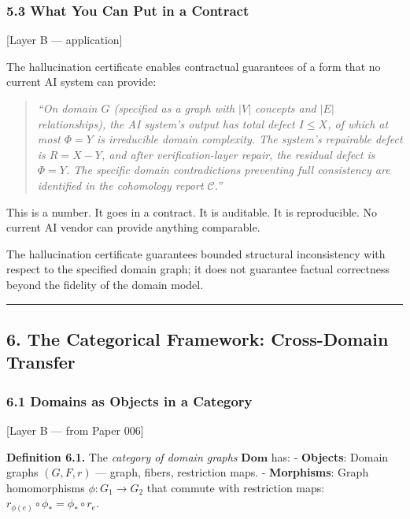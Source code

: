 \documentclass[
]{article}
\begin{document}
\subsubsection{5.3 What You Can Put in a
Contract}\label{what-you-can-put-in-a-contract}

{[}Layer B --- application{]}

The hallucination certificate enables contractual guarantees of a form
that no current AI system can provide:

\begin{quote}
\emph{``On domain \(G\) (specified as a graph with \(|V|\) concepts and
\(|E|\) relationships), the AI system's output has total defect
\(I \leq X\), of which at most \(\Phi = Y\) is irreducible domain
complexity. The system's repairable defect is \(R = X - Y\), and after
verification-layer repair, the residual defect is \(\Phi = Y\). The
specific domain contradictions preventing full consistency are
identified in the cohomology report \(\mathcal{C}\).''}
\end{quote}

This is a number. It goes in a contract. It is auditable. It is
reproducible. No current AI vendor can provide anything comparable.

The hallucination certificate guarantees bounded structural
inconsistency with respect to the specified domain graph; it does not
guarantee factual correctness beyond the fidelity of the domain model.

\begin{center}\rule{0.5\linewidth}{0.5pt}\end{center}

\subsection{6. The Categorical Framework: Cross-Domain
Transfer}\label{the-categorical-framework-cross-domain-transfer}

\subsubsection{6.1 Domains as Objects in a
Category}\label{domains-as-objects-in-a-category}

{[}Layer B --- from Paper 006{]}

\textbf{Definition 6.1.} The \emph{category of domain graphs}
\(\mathbf{Dom}\) has: - \textbf{Objects}: Domain graphs \((G, F, r)\)
--- graph, fibers, restriction maps. - \textbf{Morphisms}: Graph
homomorphisms \(\phi: G_1 \to G_2\) that commute with restriction maps:
\(r_{\phi(e)} \circ \phi_* = \phi_* \circ r_e\).
\end{document}
